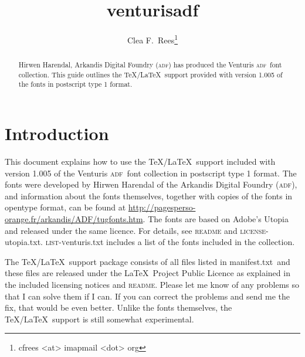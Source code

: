 \documentclass[11pt,british]{article}
\title{venturisadf}
\author{Clea F.\ Rees\footnote{cfrees <at> imapmail <dot> org}}
\date{\dyddiad}
\begin{document}
\maketitle\thispagestyle{empty}
\setlength{\parindent}{0pt}
\setlength{\parskip}{0.5em}
	
	
\newcommand*{\adf}{\textsc{adf}}
\newcommand*{\lpack}[1]{\textsf{#1}}
\newcommand*{\fgroup}[1]{\textsf{#1}}
\newcommand*{\fname}[1]{\textsf{#1}}

\begin{abstract}
	\hspace*{-\parindent}Hirwen Harendal, Arkandis Digital Foundry (\adf) has produced the Venturis \adf\ font collection. This guide outlines the \TeX/\LaTeX\ support provided with version 1.005 of the fonts in postscript type 1 format.
\end{abstract}

\tableofcontents

\section{Introduction}

This document explains how to use the \TeX/\LaTeX\ support included with version 1.005 of the Venturis \adf\ font collection in postscript type 1 format. The fonts were developed by Hirwen Harendal of the Arkandis Digital Foundry (\adf), and information about the fonts themselves, together with copies of the fonts in opentype format, can be found at \url{http://pagesperso-orange.fr/arkandis/ADF/tugfonts.htm}. The fonts are based on Adobe's Utopia and released under the same licence. For details, see \textsc{readme} and \textsc{license-}utopia.txt. \textsc{list-v}enturis.txt includes a list of the fonts included in the collection.

The \TeX/\LaTeX\ support package consists of all files listed in \lpack{manifest.txt}\ and these files are released under the \LaTeX\ Project Public Licence as explained in the included licensing notices and \textsc{readme}. Please let me know of any problems so that I can solve them if I can. If you can correct the problems and send me the fix, that would be even better. Unlike the fonts themselves, the \TeX/\LaTeX\ support is still somewhat experimental.
\end{document}
